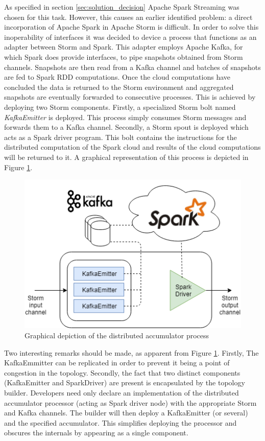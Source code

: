 As specified in section \ref{sec:solution_decision} Apache Spark Streaming was chosen for this task. However, this causes an earlier identified problem: a direct incorporation of Apache Spark in Apache Storm is difficult. In order to solve this inoperability of interfaces it was decided to device a process that functions as an adapter between Storm and Spark. This adapter employs Apache Kafka, for which Spark does provide interfaces, to pipe snapshots obtained from Storm channels. Snapshots are then read from a Kafka channel and batches of snapshots are fed to Spark RDD computations. Once the cloud computations have concluded the data is returned to the Storm environment and aggregated snapshots are eventually forwarded to consecutive processes. This is achieved by deploying two Storm components. Firstly, a specialized Storm bolt named \emph{KafkaEmitter} is deployed. This process simply consumes Storm messages and forwards them to a Kafka channel. Secondly, a Storm spout is deployed which acts as a Spark driver program. This bolt contains the instructions for the distributed computation of the Spark cloud and results of the cloud computations will be returned to it. A graphical representation of this process is depicted in Figure \ref{fig:distributed_accumulator}.

\begin{figure}
\centering
\includegraphics[width=.7\textwidth]{resources/img/distributed_accumulator.png}
\caption{Graphical depiction of the distributed accumulator process}
\label{fig:distributed_accumulator}
\end{figure}

Two interesting remarks should be made, as apparent from Figure \ref{fig:distributed_accumulator}. Firstly, The KafkaEmmitter can be replicated in order to prevent it being a point of congestion in the topology. Secondly, the fact that two distinct components (KafkaEmitter and SparkDriver) are present is encapsulated by the topology builder. Developers need only declare an implementation of the distributed accumulator processor (acting as Spark driver node) with the appropriate Storm and Kafka channels. The builder will then deploy a KafkaEmitter (or several) and the specified accumulator. This simplifies deploying the processor and obscures the internals by appearing as a single component.

